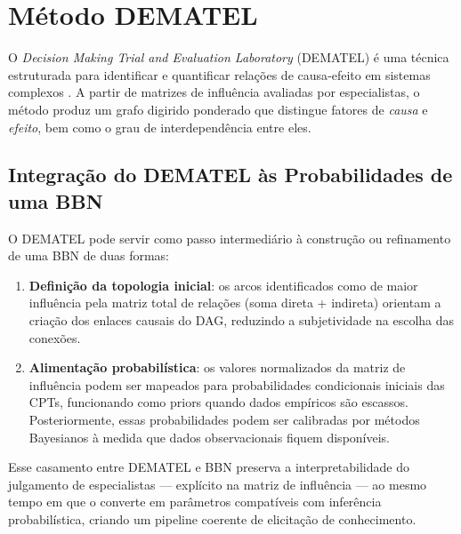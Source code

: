 \section{Método DEMATEL}
\label{sec:dematel}

O \emph{Decision Making Trial and Evaluation Laboratory} (DEMATEL) é uma técnica estruturada para identificar e quantificar relações de causa‑efeito em sistemas complexos \cite{fontela1976dematel}. A partir de matrizes de influência avaliadas por especialistas, o método produz um grafo digirido ponderado que distingue fatores de \emph{causa} e \emph{efeito}, bem como o grau de interdependência entre eles.

\subsection{Integração do DEMATEL às Probabilidades de uma BBN}
\label{subsec:dematel_bbn}

O DEMATEL pode servir como passo intermediário à construção ou refinamento de uma BBN de duas formas:

\begin{enumerate}
  \item \textbf{Definição da topologia inicial}: os arcos identificados como de maior influência pela matriz total de relações (soma direta + indireta) orientam a criação dos enlaces causais do DAG, reduzindo a subjetividade na escolha das conexões.

  \item \textbf{Alimentação probabilística}: os valores normalizados da matriz de influência podem ser mapeados para probabilidades condicionais iniciais das CPTs, funcionando como priors quando dados empíricos são escassos. Posteriormente, essas probabilidades podem ser calibradas por métodos Bayesianos à medida que dados observacionais fiquem disponíveis.
\end{enumerate}

Esse casamento entre DEMATEL e BBN preserva a interpretabilidade do julgamento de especialistas — explícito na matriz de influência — ao mesmo tempo em que o converte em parâmetros compatíveis com inferência probabilística, criando um pipeline coerente de elicitação de conhecimento.
